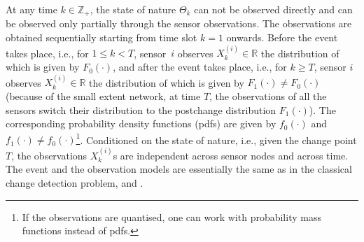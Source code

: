 \documentclass[journal]{IEEEtran}
\begin{document}
At any time $k \in {\mathbb Z}_+$, the state of nature $\Theta_k$ can
not be observed directly and can be observed only partially through the
sensor observations. The observations are obtained sequentially starting
from time slot $k = 1$ onwards. Before the event takes place, i.e., for
$1 \le k < T$, sensor~$i$ observes $X_k^{(i)} \in \mathbb{R}$ the
distribution of which is given by $F_0(\cdot)$, and after the event
takes place, i.e., for $k \ge T$, sensor $i$ observes $X_k^{(i)} \in
\mathbb{R}$ the distribution of which is given by $F_1(\cdot) \ne
F_0(\cdot)$ (because of the small extent network, at time $T$, the
observations of all the sensors switch their distribution to the
postchange distribution $F_1(\cdot)$). The corresponding probability
density functions (pdfs) are given by $f_0(\cdot)$ and $f_1(\cdot) \neq
f_0(\cdot)$\footnote{If the observations are quantised, one can work
with probability mass functions instead of pdfs.}. Conditioned on the
state of nature, i.e., given the change point $T$, the observations
$X_k^{(i)}$s are independent across sensor nodes and across time. The
event and the observation models are essentially the same as in the
classical change detection problem, \cite{shiryayev} and
\cite{veeravalli01decentralized-quickest}. 
\end{document}
